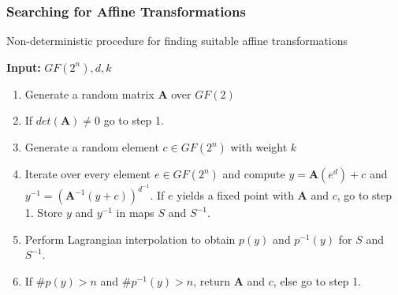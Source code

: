 \documentclass[10pt]{beamer}
\begin{document}
\begin{frame}[fragile]
	\frametitle{Searching for Affine Transformations}
	Non-deterministic procedure for finding suitable affine transformations \\

	\medskip 

	\textbf{Input:} $GF(2^n), d, k$ \\
	\begin{enumerate}
		\item Generate a random matrix $\mathbf{A}$ over $GF(2)$
		\item If $det(\mathbf{A}) \not= 0$ go to step 1.
		\item Generate a random element $c \in GF(2^n)$ with weight $k$
		\item Iterate over every element $e \in GF(2^n)$ and compute $y = \mathbf{A}(e^d) + c$ and $y^{-1} = (\mathbf{A}^{-1}(y + c))^{d^{-1}}$. If $e$ yields a fixed point with $\mathbf{A}$ and $c$, go to step 1. Store $y$ and $y^{-1}$ in maps $S$ and $S^{-1}$.
		\item Perform Lagrangian interpolation to obtain $p(y)$ and $p^{-1}(y)$ for $S$ and $S^{-1}$.
		\item If $\#p(y) > n$ and $\#p^{-1}(y) > n$, return $\mathbf{A}$ and $c$, else go to step 1.
	\end{enumerate}
\end{frame}
\end{document}
